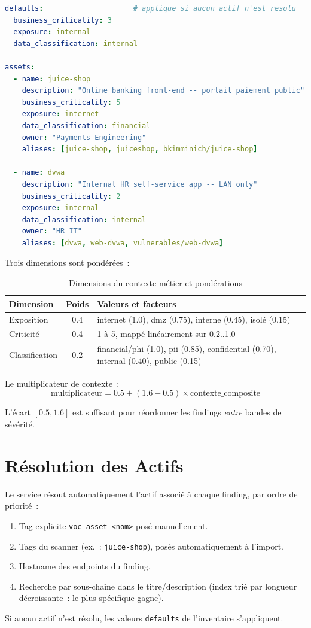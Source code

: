 \documentclass[12pt,a4paper]{report}
\begin{document}
\begin{lstlisting}[language=yaml, caption={Extrait de asset-inventory.yaml}, label={lst:asset_inventory}]
defaults:                     # applique si aucun actif n'est resolu
  business_criticality: 3
  exposure: internal
  data_classification: internal

assets:
  - name: juice-shop
    description: "Online banking front-end -- portail paiement public"
    business_criticality: 5
    exposure: internet
    data_classification: financial
    owner: "Payments Engineering"
    aliases: [juice-shop, juiceshop, bkimminich/juice-shop]

  - name: dvwa
    description: "Internal HR self-service app -- LAN only"
    business_criticality: 2
    exposure: internal
    data_classification: internal
    owner: "HR IT"
    aliases: [dvwa, web-dvwa, vulnerables/web-dvwa]
\end{lstlisting}

Trois dimensions sont pondérées~:

\begin{table}[H]
\centering
\caption{Dimensions du contexte métier et pondérations}
\small
\begin{tabularx}{\textwidth}{L{3.0cm} c X}
\toprule
\textbf{Dimension} & \textbf{Poids} & \textbf{Valeurs et facteurs} \\
\midrule
Exposition     & 0.4 & internet (1.0), dmz (0.75), interne (0.45), isolé (0.15) \\
Criticité      & 0.4 & 1 à 5, mappé linéairement sur 0.2..1.0 \\
Classification & 0.2 & financial/phi (1.0), pii (0.85), confidential (0.70), internal (0.40), public (0.15) \\
\bottomrule
\end{tabularx}
\end{table}

Le multiplicateur de contexte~:
\[
\text{multiplicateur} = 0.5 + (1.6 - 0.5) \times \text{contexte\_composite}
\]

L'écart $[0.5, 1.6]$ est suffisant pour réordonner les findings \emph{entre} bandes de sévérité.

\section{Résolution des Actifs}
Le service résout automatiquement l'actif associé à chaque finding, par ordre de priorité~:
\begin{enumerate}[nosep]
    \item Tag explicite \texttt{voc-asset-<nom>} posé manuellement.
    \item Tags du scanner (ex.~: \texttt{juice-shop}), posés automatiquement à l'import.
    \item Hostname des endpoints du finding.
    \item Recherche par sous-chaîne dans le titre/description (index trié par longueur décroissante~: le plus spécifique gagne).
\end{enumerate}
Si aucun actif n'est résolu, les valeurs \texttt{defaults} de l'inventaire s'appliquent.
\end{document}

